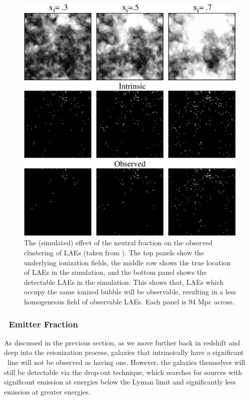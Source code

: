 \begin{figure}[!p]
  \centering
  \includegraphics[width=13cm]{McQuinnLAEClusteringLarge.eps}
  \caption{The (simulated) effect of the neutral fraction on the observed clustering of LAEs (taken from \citealt{McQuinn:2007dy}). The top panels show the underlying ionization fields, the middle row shows the true location of LAEs in the simulation, and the bottom panel shows the detectable LAEs in the simulation. This shows that, LAEs which occupy the same ionized bubble will be observable, resulting in a less homogeneous field of observable LAEs. Each panel is 94 Mpc across. }
  \label{fig:McQuinnLAEClustering}
\end{figure}

\clearpage
\subsubsection{\lya\ Emitter Fraction}

As discussed in the previous section, as we move further back in redshift and deep into the reionization process, galaxies that intrinsically have a significant \lya\ line will not be observed as having one. However, the galaxies themselves will still be detectable via the drop-out technique, which searches for sources with significant emission at energies below the Lyman limit and significantly less emission at greater energies. 


